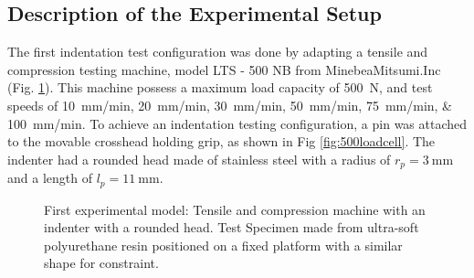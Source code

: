 \subsection*{Description of the Experimental Setup}

The first indentation test configuration was done by adapting a tensile and compression 
testing machine, model LTS - 500 NB from MinebeaMitsumi.Inc (Fig. \ref{fig:firstexperiment}). This 
machine possess a maximum load capacity of \SI{500}{\newton}, and test speeds of
\SIlist[per-mode = symbol]{10;20;30;50;75;100}{\milli \metre \per \minute}. To achieve an 
indentation testing configuration, a pin was attached to the movable crosshead holding grip, 
as shown in Fig \ref{fig:500loadcell}.
The indenter had a rounded head made of stainless steel with a
radius of $r_p = \SI{3}{\milli \m}$ and a length of $l_p = \SI{11}{\milli \m}$.

\begin{figure}%
    \centering
   \qquad
   \caption{First experimental model: Tensile and compression machine with an indenter with a rounded head. Test Specimen made from ultra-soft polyurethane resin positioned on a fixed platform with a similar shape for constraint.}%
   \label{fig:firstexperiment}%
\end{figure}

